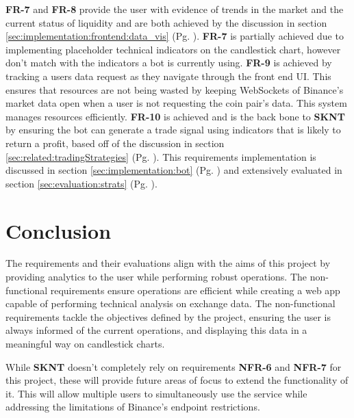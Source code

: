 \textbf{FR-7} and \textbf{FR-8} provide the user with evidence of trends in the market and the current status of liquidity and are both achieved by the discussion in section \ref{sec:implementation:frontend:data_vis} (Pg. \pageref{sec:implementation:frontend:data_vis}). \textbf{FR-7} is partially achieved due to implementing placeholder technical indicators on the candlestick chart, however don't match with the indicators a bot is currently using. \textbf{FR-9} is achieved by tracking a users data request as they navigate through the front end UI. This ensures that resources are not being wasted by keeping WebSockets of Binance's market data open when a user is not requesting the coin pair's data. This system manages resources efficiently. \textbf{FR-10} is achieved and is the back bone to \textbf{SKNT} by ensuring the bot can generate a trade signal using indicators that is likely to return a profit, based off of the discussion in section \ref{sec:related:tradingStrategies} (Pg. \pageref{sec:related:tradingStrategies}). This requirements implementation is discussed in section \ref{sec:implementation:bot} (Pg. \pageref{sec:implementation:bot}) and extensively evaluated in section \ref{sec:evaluation:strats} (Pg. \pageref{sec:evaluation:strats}).


\section{Conclusion}
\label{sec:requirements:conclusion}
\noindent The requirements and their evaluations align with the aims of this project by providing analytics to the user while performing robust operations. The non-functional requirements ensure operations are efficient while creating a web app capable of performing technical analysis on exchange data. The non-functional requirements tackle the objectives defined by the project, ensuring the user is always informed of the current operations, and displaying this data in a meaningful way on candlestick charts. 

While \textbf{SKNT} doesn't completely rely on requirements \textbf{NFR-6} and \textbf{NFR-7} for this project, these will provide future areas of focus to extend the functionality of it. This will allow multiple users to simultaneously use the service while addressing the limitations of Binance's endpoint restrictions.
